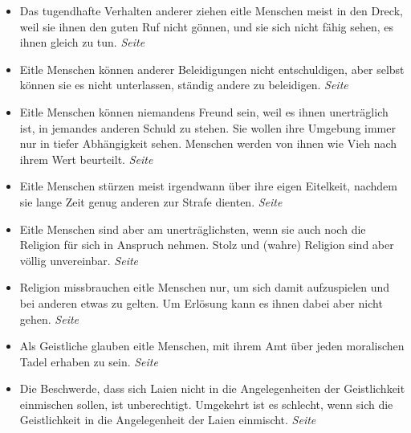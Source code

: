 \begin{itemize}
\begin{itemize}
 \item Das tugendhafte Verhalten anderer ziehen eitle Menschen meist in den Dreck,
weil sie ihnen den guten Ruf nicht gönnen, und sie sich nicht fähig sehen, es
ihnen gleich zu tun.
 \dotfill \textit{Seite~\pageref{ref:12_04_eitle_menschen_tugent}}\\

 \item Eitle Menschen können anderer Beleidigungen nicht entschuldigen, aber
selbst können sie es nicht unterlassen, ständig andere zu beleidigen.
 \dotfill \textit{Seite~\pageref{ref:12_04_eitle_menschen_beleidigung}}\\

 \item Eitle Menschen können niemandens Freund sein, weil es ihnen unerträglich
ist, in jemandes anderen Schuld zu stehen. Sie wollen ihre Umgebung immer nur in
tiefer Abhängigkeit sehen. Menschen werden von ihnen wie Vieh nach ihrem Wert
beurteilt.
 \dotfill \textit{Seite~\pageref{ref:12_05_eitle_menschen_freundschaft}}\\

 \item Eitle Menschen stürzen meist irgendwann über ihre eigen Eitelkeit,
nachdem sie lange Zeit genug anderen zur Strafe dienten.
 \dotfill \textit{Seite~\pageref{ref:12_06_eitle_menschen_sturz}}\\

 \item Eitle Menschen sind aber am unerträglichsten, wenn sie auch noch die
Religion für sich in Anspruch nehmen. Stolz und (wahre) Religion sind aber
völlig unvereinbar.
 \dotfill \textit{Seite~\pageref{ref:12_07_eitle_menschen_religion}}\\

 \item Religion missbrauchen eitle Menschen nur, um sich damit aufzuspielen und
bei anderen etwas zu gelten. Um Erlösung kann es ihnen dabei aber nicht gehen.
 \dotfill \textit{Seite~\pageref{ref:12_07_eitle_menschen_religion_2}}\\

 \item Als Geistliche glauben eitle Menschen, mit ihrem Amt über jeden
moralischen Tadel erhaben zu sein.
 \dotfill \textit{Seite~\pageref{ref:12_07_eitle_menschen_geislicher}}\\

 \item Die Beschwerde, dass sich Laien nicht in die Angelegenheiten der
Geistlichkeit einmischen sollen, ist unberechtigt. Umgekehrt ist es schlecht, wenn
sich die Geistlichkeit in die Angelegenheit der Laien einmischt.
 \dotfill \textit{Seite
\pageref{ref:12_08_eitle_menschen_leihen_vs_geisltichkeit}}\\


\end{itemize}
\end{itemize}
